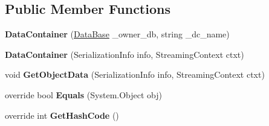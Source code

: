 \subsection*{Public Member Functions}
\begin{DoxyCompactItemize}
\item 
\hypertarget{class_dwarf_d_b_1_1_data_structures_1_1_data_container_aaef12033ab5b4b00fde86e41f4bfece2}{{\bfseries Data\+Container} (\hyperlink{class_dwarf_d_b_1_1_data_structures_1_1_data_base}{Data\+Base} \+\_\+owner\+\_\+db, string \+\_\+dc\+\_\+name)}\label{class_dwarf_d_b_1_1_data_structures_1_1_data_container_aaef12033ab5b4b00fde86e41f4bfece2}

\item 
\hypertarget{class_dwarf_d_b_1_1_data_structures_1_1_data_container_aedc4383268fbcc1f26b90e013cb9480a}{{\bfseries Data\+Container} (Serialization\+Info info, Streaming\+Context ctxt)}\label{class_dwarf_d_b_1_1_data_structures_1_1_data_container_aedc4383268fbcc1f26b90e013cb9480a}

\item 
\hypertarget{class_dwarf_d_b_1_1_data_structures_1_1_data_container_a2b870066d9ec71502d57a034c8beb610}{void {\bfseries Get\+Object\+Data} (Serialization\+Info info, Streaming\+Context ctxt)}\label{class_dwarf_d_b_1_1_data_structures_1_1_data_container_a2b870066d9ec71502d57a034c8beb610}

\item 
\hypertarget{class_dwarf_d_b_1_1_data_structures_1_1_data_container_a6cb4a4c31f7e46f814632fc161024ac1}{override bool {\bfseries Equals} (System.\+Object obj)}\label{class_dwarf_d_b_1_1_data_structures_1_1_data_container_a6cb4a4c31f7e46f814632fc161024ac1}

\item 
\hypertarget{class_dwarf_d_b_1_1_data_structures_1_1_data_container_a5f7fad1592467a438632e9351ec124fa}{override int {\bfseries Get\+Hash\+Code} ()}\label{class_dwarf_d_b_1_1_data_structures_1_1_data_container_a5f7fad1592467a438632e9351ec124fa}


\end{DoxyCompactItemize}
